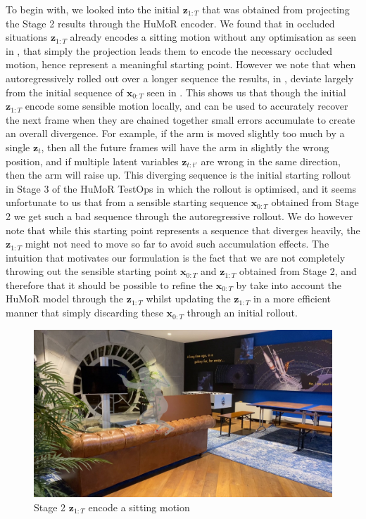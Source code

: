To begin with, we looked into the initial $\mathbf{z}_{1:T}$ that was obtained from projecting the Stage 2 results through the HuMoR encoder. We found that in occluded situations $\mathbf{z}_{1:T}$ already encodes a sitting motion without any optimisation as seen in , that simply the projection leads them to encode the necessary occluded motion, hence represent a meaningful starting point. However we note that when autoregressively rolled out over a longer sequence the results, in , deviate largely from the initial sequence of $\mathbf{x}_{0:T}$ seen in . This shows us that though the initial $\mathbf{z}_{1:T}$ encode some sensible motion locally, and can be used to accurately recover the next frame when they are chained together small errors accumulate to create an overall divergence. For example, if the arm is moved slightly too much by a single $\mathbf{z}_t$, then all the future frames will have the arm in slightly the wrong position, and if multiple latent variables $\mathbf{z}_{t:t'}$ are wrong in the same direction, then the arm will raise up. This diverging sequence is the initial starting rollout in Stage 3 of the HuMoR TestOps in which the rollout is optimised, and it seems unfortunate to us that from a sensible starting sequence $\mathbf{x}_{0:T}$ obtained from Stage 2 we get such a bad sequence through the autoregressive rollout. We do however note that while this starting point represents a sequence that diverges heavily, the $\mathbf{z}_{1:T}$ might not need to move so far to avoid such accumulation effects. The intuition that motivates our formulation is the fact that we are not completely throwing out the sensible starting point $\mathbf{x}_{0:T}$ and $\mathbf{z}_{1:T}$ obtained from Stage 2, and therefore that it should be possible to refine the $\mathbf{x}_{0:T}$ by take into account the HuMoR model through the $\mathbf{z}_{1:T}$ whilst updating the $\mathbf{z}_{1:T}$ in a more efficient manner that simply discarding these $\mathbf{x}_{0:T}$ through an initial rollout.

\begin{figure}
    \centering
    \includegraphics[width=1\textwidth]{Figures/humor/improvement/Rollout_stage_2/sitting_clip/rollout_sitting_example/frame_00000078.jpg}
    \caption{Stage 2 $\mathbf{z}_{1:T}$ encode a sitting motion}
    \label{fig:humor_stage_2_rollout_sitting}
\end{figure}


